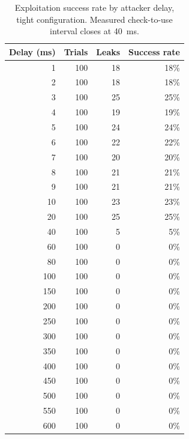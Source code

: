 \begin{table}[ht]
\centering
\begin{tabular}{rrrr}
\hline
Delay (ms) & Trials & Leaks & Success rate \\
\hline
1 & 100 & 18 & 18\% \\
2 & 100 & 18 & 18\% \\
3 & 100 & 25 & 25\% \\
4 & 100 & 19 & 19\% \\
5 & 100 & 24 & 24\% \\
6 & 100 & 22 & 22\% \\
7 & 100 & 20 & 20\% \\
8 & 100 & 21 & 21\% \\
9 & 100 & 21 & 21\% \\
10 & 100 & 23 & 23\% \\
20 & 100 & 25 & 25\% \\
40 & 100 & 5 & 5\% \\
60 & 100 & 0 & 0\% \\
80 & 100 & 0 & 0\% \\
100 & 100 & 0 & 0\% \\
150 & 100 & 0 & 0\% \\
200 & 100 & 0 & 0\% \\
250 & 100 & 0 & 0\% \\
300 & 100 & 0 & 0\% \\
350 & 100 & 0 & 0\% \\
400 & 100 & 0 & 0\% \\
450 & 100 & 0 & 0\% \\
500 & 100 & 0 & 0\% \\
550 & 100 & 0 & 0\% \\
600 & 100 & 0 & 0\% \\
\hline
\end{tabular}
\caption{Exploitation success rate by attacker delay, tight configuration. Measured check-to-use interval closes at 40~ms.}
\label{tab:success-tight}
\end{table}
